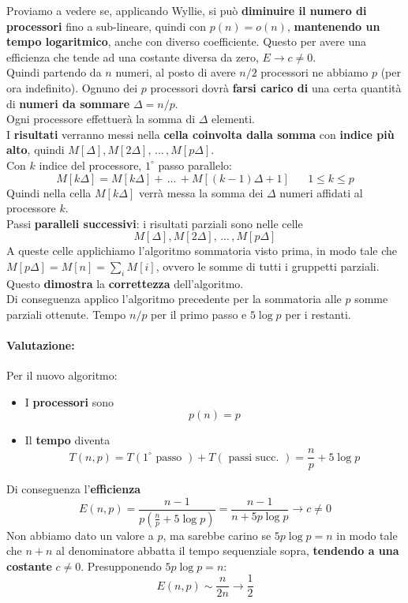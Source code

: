 \newpage

Proviamo a vedere se, applicando Wyllie, si può \textbf{diminuire il numero di processori} fino a sub-lineare, quindi con $p(n) = o(n)$, \textbf{mantenendo un tempo logaritmico}, anche con diverso coefficiente. Questo per avere una efficienza che tende ad una costante diversa da zero, $E \rightarrow c \neq 0$. \\

Quindi partendo da $n$ numeri, al posto di avere $n/2$ processori ne abbiamo $p$ (per ora indefinito). Ognuno dei $p$ processori dovrà \textbf{farsi carico di} una certa quantità di \textbf{numeri da sommare} $\Delta = n/p$.\\
Ogni processore effettuerà la somma di $\Delta$ elementi. \\

I \textbf{risultati} verranno messi nella \textbf{cella coinvolta dalla somma} con \textbf{indice più alto}, quindi $M[\Delta], M[2 \Delta], \, ... \, , M[p \Delta]$.\\

Con $k$ indice del processore, $1^\circ$ passo parallelo:
$$ M[k \Delta] = M[k \Delta] + \, ... \, + M[(k-1) \Delta + 1] \;\;\;\;\;\; 1 \leq k \leq p $$
Quindi nella cella $M[k \Delta]$ verrà messa la somma dei $\Delta$ numeri affidati al processore $k$.\\

Passi \textbf{paralleli successivi}: i risultati parziali sono nelle celle
$$ M[\Delta], M[2\Delta], \, ... \, , M[p \Delta] $$
A queste celle applichiamo l'algoritmo sommatoria visto prima, in modo tale che $ M[p \Delta] = M[n] = \sum_i M[i] $, ovvero le somme di tutti i gruppetti parziali.\\
Questo \textbf{dimostra} la \textbf{correttezza} dell'algoritmo.\\

Di conseguenza applico l'algoritmo precedente per la sommatoria alle $p$ somme parziali ottenute. Tempo $n/p$ per il primo passo e $5 \log p$ per i restanti.\\

\newpage

\paragraph{Valutazione:} Per il nuovo algoritmo:
\begin{itemize}
	\item I \textbf{processori} sono
	$$p (n) = p $$
	
	\item Il \textbf{tempo} diventa 
	$$T (n,p) = T(1^\circ \text{ passo }) + T(\text{ passi succ. }) = \frac{n}{p} + 5 \log p$$
\end{itemize}
Di conseguenza l'\textbf{efficienza}
$$ E (n,p) = \frac{n-1}{p\left(\frac{n}{p} + 5 \log p \right)} = \frac{n-1}{n + 5p \log p} \rightarrow c \neq 0 $$
Non abbiamo dato un valore a $p$, ma sarebbe carino se $5p \log p = n$ in modo tale che $n+n$ al denominatore abbatta il tempo sequenziale sopra, \textbf{tendendo a una costante} $c \neq 0$. Presupponendo $5p \log p = n$:
$$ E (n,p) \sim \frac{n}{2n} \rightarrow \frac{1}{2} $$

